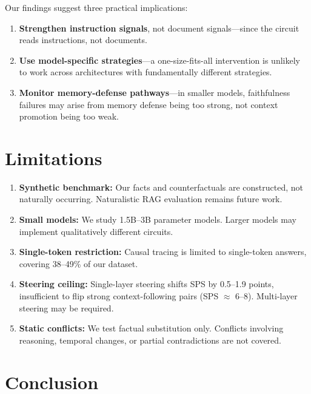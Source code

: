 \documentclass{article}
\begin{document}
Our findings suggest three practical implications:
\begin{enumerate}
    \item \textbf{Strengthen instruction signals}, not document signals---since the circuit reads instructions, not documents.
    \item \textbf{Use model-specific strategies}---a one-size-fits-all intervention is unlikely to work across architectures with fundamentally different strategies.
    \item \textbf{Monitor memory-defense pathways}---in smaller models, faithfulness failures may arise from memory defense being too strong, not context promotion being too weak.
\end{enumerate}

\section{Limitations}
\label{sec:limits}

\begin{enumerate}
    \item \textbf{Synthetic benchmark:} Our facts and counterfactuals are constructed, not naturally occurring. Naturalistic RAG evaluation remains future work.
    \item \textbf{Small models:} We study 1.5B--3B parameter models. Larger models may implement qualitatively different circuits.
    \item \textbf{Single-token restriction:} Causal tracing is limited to single-token answers, covering 38--49\% of our dataset.
    \item \textbf{Steering ceiling:} Single-layer steering shifts SPS by 0.5--1.9 points, insufficient to flip strong context-following pairs (SPS $\approx$ 6--8). Multi-layer steering may be required.
    \item \textbf{Static conflicts:} We test factual substitution only. Conflicts involving reasoning, temporal changes, or partial contradictions are not covered.
\end{enumerate}

\section{Conclusion}
\label{sec:conclusion}
\end{document}
